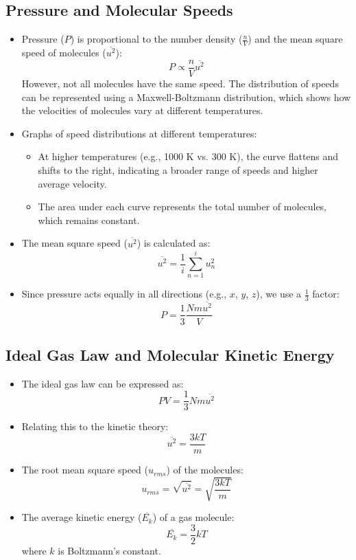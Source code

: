 \documentclass{report}
\begin{document}
\subsection{Pressure and Molecular Speeds}
\begin{itemize}
	\item Pressure ($P$) is proportional to the number density ($\frac{n}{V}$) and the mean square speed of molecules ($\overline{u^2}$):
	      \[
		      P \propto \frac{n}{V} \overline{u^2}
	      \]
	      However, not all molecules have the same speed. The distribution of speeds can be represented using a Maxwell-Boltzmann distribution, which shows how the velocities of molecules vary at different temperatures.

	\item Graphs of speed distributions at different temperatures:
	      \begin{itemize}
		      \item At higher temperatures (e.g., 1000 K vs. 300 K), the curve flattens and shifts to the right, indicating a broader range of speeds and higher average velocity.
		      \item The area under each curve represents the total number of molecules, which remains constant.
	      \end{itemize}

	\item The mean square speed ($\overline{u^2}$) is calculated as:
	      \[
		      \overline{u^2} = \frac{1}{i} \sum_{n=1}^{i} u_n^2
	      \]

	\item Since pressure acts equally in all directions (e.g., $x$, $y$, $z$), we use a $\frac{1}{3}$ factor:
	      \[
		      P = \frac{1}{3} \frac{Nm \overline{u^2}}{V}
	      \]
\end{itemize}

\subsection{Ideal Gas Law and Molecular Kinetic Energy}
\begin{itemize}
	\item The ideal gas law can be expressed as:
	      \[
		      PV = \frac{1}{3} Nm \overline{u^2}
	      \]

	\item Relating this to the kinetic theory:
	      \[
		      \overline{u^2} = \frac{3kT}{m}
	      \]

	\item The root mean square speed ($u_{rms}$) of the molecules:
	      \[
		      u_{rms} = \sqrt{\overline{u^2}} = \sqrt{\frac{3kT}{m}}
	      \]

	\item The average kinetic energy ($\overline{E_k}$) of a gas molecule:
	      \[
		      \overline{E_k} = \frac{3}{2} kT
	      \]
	      where $k$ is Boltzmann's constant.
\end{itemize}
\end{document}
